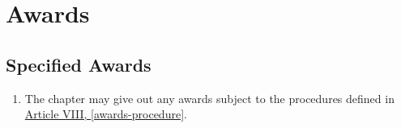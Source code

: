 \chapter{Awards}

\section{Specified Awards}

	\begin{enumerate}
		\item The chapter may give out any awards subject to the procedures defined in \hyperref[awards-procedure]{Article VIII, \autoref*{awards-procedure}}.
	\end{enumerate}




